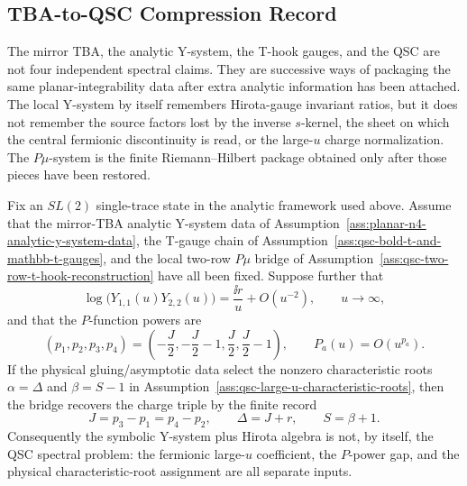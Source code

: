 \subsection{TBA-to-QSC Compression Record}

The mirror TBA, the analytic Y-system, the T-hook gauges, and the QSC are not
four independent spectral claims.  They are successive ways of packaging the
same planar-integrability data after extra analytic information has been
attached.  The local Y-system by itself remembers Hirota-gauge invariant
ratios, but it does not remember the source factors lost by the inverse
\(s\)-kernel, the sheet on which the central fermionic discontinuity is read,
or the large-\(u\) charge normalization.  The \(P\mu\)-system is the finite
Riemann--Hilbert package obtained only after those pieces have been restored.

\begin{proposition}
\label{prop:qsc-tba-to-qsc-charge-record}
Fix an \(SL(2)\) single-trace state in the analytic framework used above.
Assume that the mirror-TBA analytic Y-system data of
Assumption~\ref{ass:planar-n4-analytic-y-system-data}, the T-gauge chain of
Assumption~\ref{ass:qsc-bold-t-and-mathbb-t-gauges}, and the local
two-row \(P\mu\) bridge of
Assumption~\ref{ass:qsc-two-row-t-hook-reconstruction} have all been fixed.
Suppose further that
\[
  \log\bigl(Y_{1,1}(u)Y_{2,2}(u)\bigr)
  =
  \frac{\ii r}{u}+O(u^{-2}),
  \qquad u\to\infty ,
\]
and that the \(P\)-function powers are
\[
  (p_1,p_2,p_3,p_4)
  =
  \left(-\frac J2,-\frac J2-1,\frac J2,\frac J2-1\right),
  \qquad P_a(u)=O(u^{p_a}).
\]
If the physical gluing/asymptotic data select the nonzero characteristic roots
\(\alpha=\Delta\) and \(\beta=S-1\) in
Assumption~\ref{ass:qsc-large-u-characteristic-roots}, then the bridge
recovers the charge triple by the finite record
\begin{equation}
  J=p_3-p_1=p_4-p_2,\qquad
  \Delta=J+r,\qquad
  S=\beta+1.
  \label{eq:qsc-tba-to-qsc-charge-record}
\end{equation}
Consequently the symbolic Y-system plus Hirota algebra is not, by itself, the
QSC spectral problem: the fermionic large-\(u\) coefficient, the \(P\)-power
gap, and the physical characteristic-root assignment are all separate inputs.
\end{proposition}

